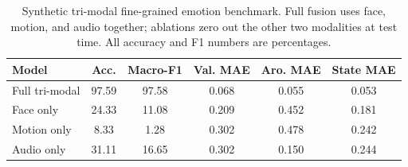 \begin{table}[t]
\centering
\caption{Synthetic tri-modal fine-grained emotion benchmark. Full fusion uses face, motion, and audio together; ablations zero out the other two modalities at test time. All accuracy and F1 numbers are percentages.}
\label{tab:trimodal-results}
\small
\begin{tabular}{lccccc}
\toprule
Model & Acc. & Macro-F1 & Val. MAE & Aro. MAE & State MAE \\
\midrule
Full tri-modal & 97.59 & 97.58 & 0.068 & 0.055 & 0.053 \\
Face only & 24.33 & 11.08 & 0.209 & 0.452 & 0.181 \\
Motion only & 8.33 & 1.28 & 0.302 & 0.478 & 0.242 \\
Audio only & 31.11 & 16.65 & 0.302 & 0.150 & 0.244 \\
\bottomrule
\end{tabular}
\end{table}
